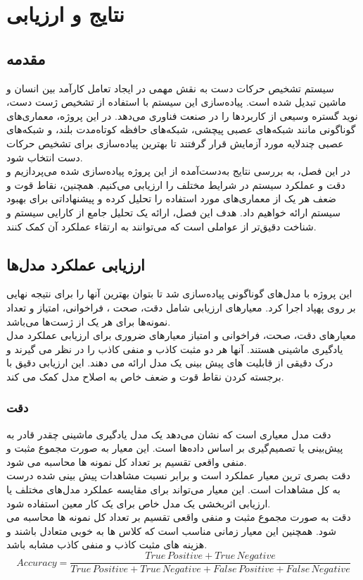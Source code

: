 \chapter{نتایج و ارزیابی}
\section{مقدمه}
سیستم تشخیص حرکات دست به نقش مهمی در ایجاد تعامل کارآمد بین انسان و ماشین تبدیل شده است. پیاده‌سازی این سیستم با استفاده از تشخیص ژست دست، نوید گستره وسیعی از کاربردها را در صنعت فناوری می‌دهد. در این پروژه، 
معماری‌های گوناگونی مانند شبکه‌های عصبی پیچشی، شبکه‌های حافظه کوتاه‌مدت بلند، و شبکه‌های عصبی چندلایه مورد آزمایش قرار گرفتند تا بهترین پیاده‌سازی برای تشخیص حرکات دست انتخاب شود. 
\\
در این فصل، به بررسی نتایج به‌دست‌آمده از این پروژه پیاده‌سازی شده می‌پردازیم و دقت و عملکرد سیستم در شرایط مختلف را ارزیابی می‌کنیم. همچنین، نقاط قوت و ضعف هر یک از معماری‌های مورد استفاده 
را تحلیل کرده و پیشنهاداتی برای بهبود سیستم ارائه خواهیم داد. هدف این فصل، ارائه یک تحلیل جامع از کارایی سیستم و شناخت دقیق‌تر از عواملی است که می‌توانند به ارتقاء عملکرد آن کمک کنند.


\section{ارزیابی عملکرد مدل‌ها}

این پروژه با مدل‌های گوناگونی پیاده‌سازی شد تا بتوان بهترین آنها را برای نتیجه نهایی بر روی پهپاد اجرا کرد. معیارهای ارزیابی شامل دقت، صحت ، فراخوانی، امتیاز  و
تعداد نمونه‌ها برای هر یک از ژست‌ها می‌باشد.
\\
معیار‌های دقت، صحت، فراخوانی و امتیاز  معیارهای ضروری برای ارزیابی عملکرد مدل یادگیری ماشینی هستند. آنها هر دو مثبت کاذب و منفی کاذب را در نظر
می گیرند و درک دقیقی از قابلیت های پیش بینی یک مدل ارائه می دهند. این ارزیابی دقیق با برجسته کردن نقاط قوت و ضعف خاص به اصلاح مدل کمک می کند.


\subsection{دقت}
دقت مدل معیاری است که نشان می‌دهد یک مدل یادگیری ماشینی چقدر قادر به پیش‌بینی یا تصمیم‌گیری بر اساس داده‌ها است. این معیار به صورت مجموع مثبت و منفی واقعی تقسیم بر تعداد کل نمونه ها محاسبه می شود.
\\
دقت بصری ترین معیار عملکرد است و برابر نسبت مشاهدات پیش بینی شده درست به کل مشاهدات است. این معیار می‌تواند برای مقایسه عملکرد مدل‌های مختلف یا ارزیابی اثربخشی یک مدل خاص برای یک کار معین استفاده شود.
\\
دقت به صورت مجموع مثبت و منفی واقعی تقسیم بر تعداد کل نمونه ها محاسبه می شود. همچنین این معیار زمانی مناسب است که کلاس ها به خوبی متعادل باشند و هزینه های مثبت کاذب و منفی کاذب مشابه باشد.
\[ Accuracy = \frac{True \, Positive + True \, Negative}{True \, Positive + True \, Negative +  False \, Positive + False \, Negative} \]

